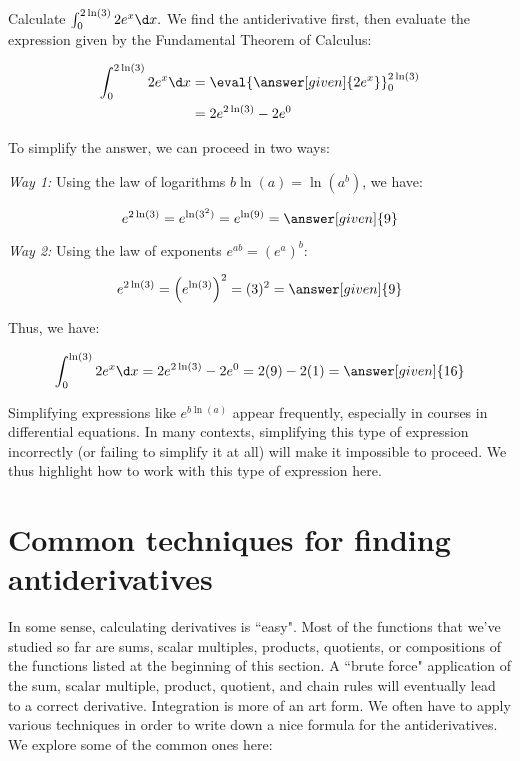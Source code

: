 \documentclass[nooutcomes]{ximera}
\begin{document}
\begin{example}
Calculate $\int_0^{2\ln(3)} 2e^x \d x.$  We find the antiderivative first, then evaluate the expression given by the Fundamental Theorem of Calculus:

\begin{align*}
\int_0^{2\ln(3)} 2e^x \d x &= \eval{\answer[given]{2e^x}}_0^{2\ln(3)} \\
&= 2e^{2\ln(3)}-2e^0 \\
\end{align*}

To simplify the answer, we can proceed in two ways:

\emph{Way 1:} Using the law of logarithms $b \ln(a) = \ln(a^b)$, we have:

\[
e^{2\ln(3)} = e^{\ln(3^2)} = e^{\ln(9)} = \answer[given]{9}
\]

\emph{Way 2:} Using the law of exponents $e^{ab} = \left(e^a\right)^b$:

\[
e^{2\ln(3)} = \left(e^{\ln(3)}\right)^2 = (3)^2 = \answer[given]{9}
\]

Thus, we have:

\[
\int_0^{\ln(3)} 2e^x \d x = 2e^{2\ln(3)}-2e^0 = 2(9)-2(1) = \answer[given]{16}
\]

\begin{remark}
Simplifying expressions like $e^{b \ln(a)}$ appear frequently, especially in courses in differential equations.  In many contexts, simplifying this type of expression incorrectly (or failing to simplify it at all) will make it impossible to proceed.  We thus highlight how to work with this type of expression here.
\end{remark}
\end{example}




\section{Common techniques for finding antiderivatives}
In some sense, calculating derivatives is ``easy".  Most of the functions that we've studied so far are sums, scalar multiples, products, quotients, or compositions of the functions listed at the beginning of this section.  A ``brute force" application of the sum, scalar multiple, product, quotient, and chain rules will eventually lead to a correct derivative.  Integration is more of an art form.  We often have to apply various techniques in order to write down a nice formula for the antiderivatives. We explore some of the common ones here:
\end{document}
